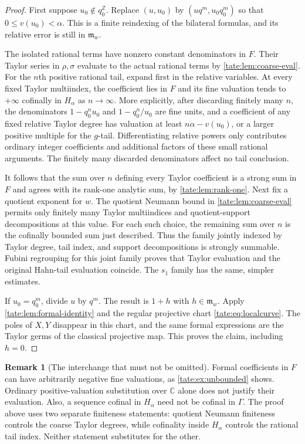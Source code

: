 \documentclass[11pt,letterpaper]{article}
\theoremstyle{definition}
\newtheorem{remark}[remark]{Remark}
\newcommand{\C}{\mathbb C}
\newcommand{\Z}{\mathbb Z}
\newcommand{\m}{\mathfrak m}
\begin{document}
\begin{proof}
First suppose $u_0\notin q_0^\Z$. Replace $(u,u_0)$ by
$(u q^m,u_0 q_0^m)$ so that
$0\le v(u_0)<\alpha$. This is a finite reindexing of the bilateral
formulas, and its relative error is still in $\m_w$.

The isolated rational terms have nonzero constant denominators in $F$.
Their Taylor series in $\rho,\sigma$ evaluate to the actual rational
terms by \cref{tate:lem:coarse-eval}. For the $n$th positive rational tail,
expand first in the relative variables. At every fixed Taylor
multiindex, the coefficient lies in $F$ and its fine valuation tends
to $+\infty$ cofinally in $H_\alpha$ as $n\to\infty$.
More explicitly, after discarding finitely many $n$, the denominators
$1-q_0^nu_0$ and $1-q_0^n/u_0$ are fine units, and a coefficient of
any fixed relative Taylor degree has valuation at least
$n\alpha-v(u_0)$, or a larger positive multiple for the $g$-tail.
Differentiating relative powers only contributes ordinary integer
coefficients and additional factors of these small rational arguments.
The finitely many discarded denominators affect no tail conclusion.

It follows that the sum over $n$ defining every Taylor coefficient is a
strong sum in $F$ and agrees with its rank-one analytic sum, by
\cref{tate:lem:rank-one}. Next fix a quotient exponent for $w$. The quotient
Neumann bound in \cref{tate:lem:coarse-eval} permits only finitely many
Taylor multiindices and quotient-support decompositions at this value.
For each such choice, the remaining sum over $n$ is the cofinally
bounded sum just described. Thus the family jointly indexed by Taylor
degree, tail index, and support decompositions is strongly summable.
Fubini regrouping for this joint family proves that Taylor evaluation
and the original Hahn-tail evaluation coincide. The $s_1$ family has
the same, simpler estimates.

If $u_0=q_0^m$, divide $u$ by $q^m$. The result is $1+h$ with
$h\in\m_w$. Apply \cref{tate:lem:formal-identity} and the regular projective
chart \eqref{tate:eq:localcurve}. The poles of $X,Y$ disappear in this chart,
and the same formal expressions are the Taylor germs of the classical
projective map. This proves the claim, including $h=0$.
\end{proof}

\begin{remark}[The interchange that must not be omitted]
Formal coefficients in $F$ can have arbitrarily negative fine
valuations, as \cref{tate:ex:unbounded} shows. Ordinary positive-valuation
substitution over $\C$ alone does not justify their evaluation. Also,
a sequence cofinal in $H_\alpha$ need not be cofinal in $\Gamma$.
The proof above uses two separate finiteness statements: quotient
Neumann finiteness controls the coarse Taylor degrees, while cofinality
inside $H_\alpha$ controls the rational tail index. Neither statement
substitutes for the other.
\end{remark}
\end{document}

